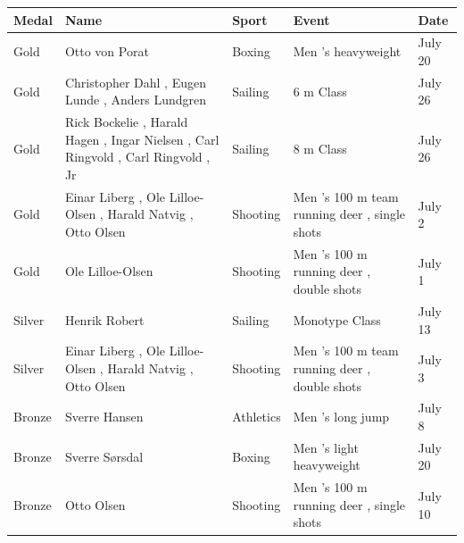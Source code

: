 \documentclass{article}
\begin{document}
\begin{tabular}{lllll}
\toprule
Medal & Name & Sport & Event & Date \\
\midrule
Gold & Otto von Porat & Boxing & Men 's heavyweight & July 20 \\
Gold & Christopher Dahl , Eugen Lunde , Anders Lundgren & Sailing & 6 m Class & July 26 \\
Gold & Rick Bockelie , Harald Hagen , Ingar Nielsen , Carl Ringvold , Carl Ringvold , Jr & Sailing & 8 m Class & July 26 \\
Gold & Einar Liberg , Ole Lilloe-Olsen , Harald Natvig , Otto Olsen & Shooting & Men 's 100 m team running deer , single shots & July 2 \\
Gold & Ole Lilloe-Olsen & Shooting & Men 's 100 m running deer , double shots & July 1 \\
Silver & Henrik Robert & Sailing & Monotype Class & July 13 \\
Silver & Einar Liberg , Ole Lilloe-Olsen , Harald Natvig , Otto Olsen & Shooting & Men 's 100 m team running deer , double shots & July 3 \\
Bronze & Sverre Hansen & Athletics & Men 's long jump & July 8 \\
Bronze & Sverre Sørsdal & Boxing & Men 's light heavyweight & July 20 \\
Bronze & Otto Olsen & Shooting & Men 's 100 m running deer , single shots & July 10 \\
\bottomrule
\end{tabular}
\end{document}
